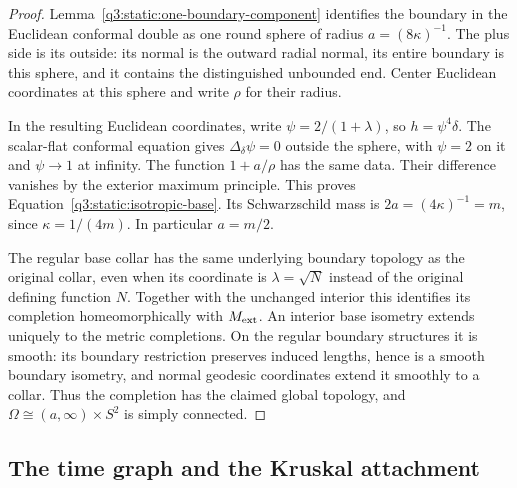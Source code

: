 \begin{proof}
Lemma~\ref{q3:static:one-boundary-component} identifies the boundary
in the Euclidean conformal double as one round sphere of radius
$a=(8\kappa)^{-1}$. The plus side is its outside: its normal is the
outward radial normal, its entire boundary is this sphere, and it
contains the distinguished unbounded end. Center Euclidean
coordinates at this sphere and write $\rho$ for their radius.

In the resulting Euclidean coordinates, write
\(\psi=2/(1+\lambda)\), so \(h=\psi^4\delta\).
The scalar-flat conformal equation gives \(\Delta_\delta\psi=0\)
outside the sphere, with \(\psi=2\) on it and \(\psi\to1\)
at infinity. The function \(1+a/\rho\) has the same data.
Their difference vanishes by the exterior maximum principle.
This proves Equation~\eqref{q3:static:isotropic-base}.
Its Schwarzschild mass is $2a=(4\kappa)^{-1}=m$, since
$\kappa=1/(4m)$. In particular $a=m/2$.

The regular base collar has the same underlying boundary topology
as the original collar, even when its coordinate is
\(\lambda=\sqrt N\) instead of the original defining function \(N\).
Together with the unchanged interior this identifies its completion
homeomorphically with \(M_{\mathrm{ext}}\).
An interior base isometry extends uniquely to the metric completions.
On the regular boundary structures it is smooth: its boundary
restriction preserves induced lengths, hence is a smooth boundary
isometry, and normal geodesic coordinates extend it smoothly to
a collar.
Thus the completion has the claimed global topology, and
\(\Omega\cong(a,\infty)\times S^2\) is simply connected.
\end{proof}

\subsection{The time graph and the Kruskal attachment}
\label{q3:static:embedding-subsection}

